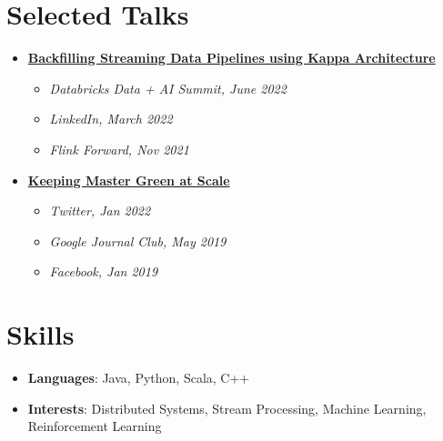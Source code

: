 \documentclass[letterpaper,11pt]{article}
\newcommand{\resumeSubHeadingListStart}{\begin{itemize}[leftmargin=*]}
\newcommand{\resumeSubHeadingListEnd}{\end{itemize}}
\newcommand{\resumeItemListStart}{\begin{itemize}}
\newcommand{\resumeItemListEnd}{\end{itemize}}
\newcommand{\resumeTalkTitle}[1]{
  \item{
    \textbf{#1} 
  }\vspace{-5pt}
}
\newcommand{\resumeTalk}[2]{
  \item
    \textit{#1}
}
\begin{document}
\section{Selected Talks}
\resumeSubHeadingListStart
\resumeTalkTitle{\href{https://www.sundaram.io/slides/dais22.pdf}{Backfilling Streaming Data Pipelines using Kappa Architecture}}
{
  \resumeItemListStart
  \resumeTalk {Databricks Data + AI Summit, June 2022} {San Francisco, CA}
  \resumeTalk {LinkedIn, March 2022} {Mountain View, CA}
  \resumeTalk {Flink Forward, Nov 2021} {San Francisco, CA}
  \resumeItemListEnd
}
\resumeTalkTitle{\href{https://www.sundaram.io/slides/eurosys19.pdf}{Keeping Master Green at Scale}}
{
  \resumeItemListStart
  \resumeTalk {Twitter, Jan 2022} {San Francisco, CA}
  \resumeTalk {Google Journal Club, May 2019} {San Francisco, CA}
  \resumeTalk {Facebook, Jan 2019} {Menlo Park, CA}
  \resumeItemListEnd
}
\resumeSubHeadingListEnd

%
\section{Skills}
\resumeSubHeadingListStart
\item
\textbf{Languages}{: Java, Python, Scala, C++}
\item \vspace{-5pt}
\textbf{Interests}{: Distributed Systems, Stream Processing, Machine Learning, Reinforcement Learning}
\resumeSubHeadingListEnd


\end{document}
